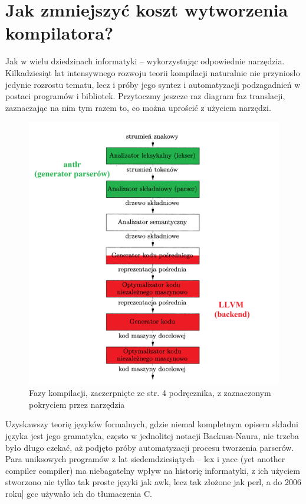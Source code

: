 

\section{Jak zmniejszyć koszt wytworzenia kompilatora?}
Jak w wielu dziedzinach informatyki – wykorzystując odpowiednie narzędzia. Kilkadziesiąt lat intensywnego rozwoju teorii kompilacji naturalnie nie przyniosło jedynie rozrostu tematu, lecz i próby jego syntez i automatyzacji podzagadnień w postaci programów i bibliotek. Przytoczmy jeszcze raz diagram faz translacji, zaznaczając na nim tym razem to, co można uprościć z użyciem narzędzi.
\begin{figure}[H]
    \centering
    \includegraphics[height=0.8\linewidth]{images/wstep/fazy_kompilacji.png_bin_antlr_llvm_podpisany.png}
    \caption{Fazy kompilacji, zaczerpnięte ze str. 4 podręcznika\cite{DRAGON_BOOK}, z zaznaczonym pokryciem przez narzędzia}
\end{figure}
Uzyskawszy teorię języków formalnych, gdzie niemal kompletnym opisem składni języka jest jego gramatyka, często w jednolitej notacji Backusa-Naura, nie trzeba było długo czekać, aż podjęto próby automatyzacji procesu tworzenia parserów. Para uniksowych programów z lat siedemdziesiątych – lex i yacc (yet another compiler compiler) ma niebagatelny wpływ na historię informatyki, z ich użyciem stworzono nie tylko tak proste języki jak awk, lecz tak złożone jak perl\cite{parsing_timeline_kegler}, a do 2006 roku] gcc używało ich do tłumaczenia C.\cite{gcc_2006_release_note}

